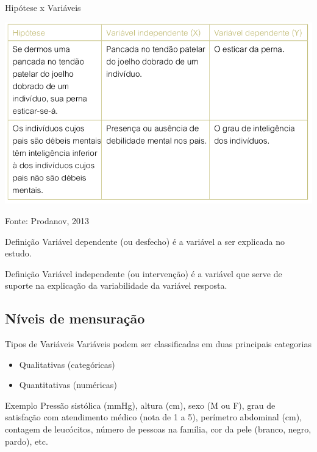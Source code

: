 \documentclass{beamer}
\begin{document}
\begin{frame}{Hipótese x Variáveis}
  \begin{center}
  \includegraphics[height=0.8\textheight]{Hipoteses_variaveis/hipotese_variaveis}
\end{center}

  \vfill
  \scriptsize
  \hfill Fonte: Prodanov, 2013
\end{frame}

\begin{frame}
  \begin{block}{Definição}
    \footnotesize
    Variável \alert{dependente} (ou desfecho) é a variável a ser
    explicada no estudo.
  \end{block}
  \begin{block}{Definição}
    \footnotesize
    Variável \alert{independente} (ou intervenção) é a variável que
    serve de suporte na explicação da variabilidade da variável
    resposta.
  \end{block}
\end{frame}

\subsection{Níveis de mensuração}

\begin{frame}{Tipos de Variáveis}
Variáveis podem ser classificadas em duas principais categorias
  \begin{itemize}
  \item Qualitativas (categóricas)
  \item Quantitativas (numéricas)
  \end{itemize}
  \begin{exampleblock}{Exemplo}
    Pressão sistólica (mmHg), altura (cm), sexo (M ou F), grau de
    satisfação com atendimento médico (nota de 1 a 5), perímetro
    abdominal (cm), contagem de leucócitos, número de pessoas na
    família, cor da pele (branco, negro, pardo), etc.
  \end{exampleblock}
\end{frame}
\end{document}
